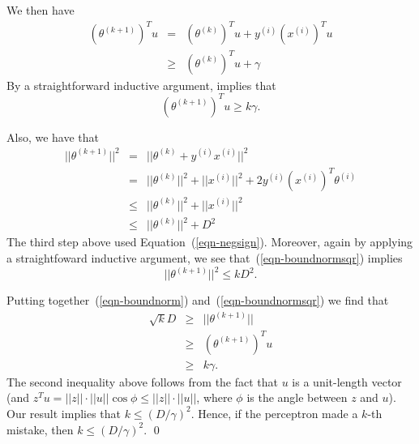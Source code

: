 \documentclass{article}
\begin{document}
We then have 
\begin{eqnarray*}
(\theta^{(k+1)})^T u &=& (\theta^{(k)})^T u + y^{(i)} (x^{(i)})^T u \\
&\geq& (\theta^{(k)})^T u + \gamma 
\end{eqnarray*}
By a straightforward inductive argument,
implies that 
\begin{equation}
(\theta^{(k+1)})^T u \geq k \gamma.\label{eqn-boundnorm}
\end{equation}

Also, we have that 
\begin{eqnarray}
 || \theta^{(k+1)} ||^2 &=& ||\theta^{(k)} + y^{(i)} x^{(i)}||^2  \nonumber \\
 &=& ||\theta^{(k)}||^2  + ||x^{(i)}||^2  + 2 y^{(i)}(x^{(i)})^T \theta^{(i)}\nonumber \\
 &\leq& ||\theta^{(k)}||^2  + ||x^{(i)}||^2  \nonumber \\
 &\leq& ||\theta^{(k)}||^2  + D^2  \label{eqn-boundnormsqr}
\end{eqnarray}
The third step above used Equation~(\ref{eqn-negsign}).
Moreover, again by applying a straightfoward inductive 
argument, we see that~(\ref{eqn-boundnormsqr}) implies 
\begin{equation}
||\theta^{(k+1)} ||^2 \leq k D^2.  \label{eqn-boundnormsqr2} 
\end{equation}

Putting together~(\ref{eqn-boundnorm}) and~(\ref{eqn-boundnormsqr}) 
we find that 
\begin{eqnarray*}
\sqrt{k} D &\geq& ||\theta^{(k+1)}|| \\
&\geq& (\theta^{(k+1)})^T u \\
&\geq& k \gamma. 
\end{eqnarray*}
The second inequality above follows from the fact that $u$ is a unit-length
vector (and $z^Tu = ||z|| \cdot ||u|| \cos\phi \leq ||z|| \cdot ||u||$, where
$\phi$ is the angle between $z$ and $u$).
Our result implies that $k \leq (D/\gamma)^2$.   Hence, if the perceptron made
a $k$-th mistake, then $k \leq (D/\gamma)^2$. \qed
\end{document}
